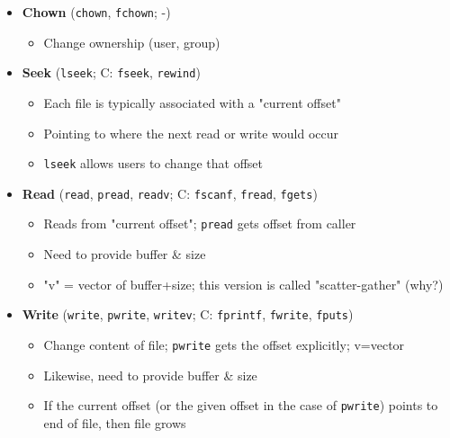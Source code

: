 \documentclass[openany,12pt]{book}
\begin{document}
\begin{itemize}
    \item \textbf{Chown} (\texttt{chown}, \texttt{fchown}; -)
    \begin{itemize}
        \item Change ownership (user, group)
    \end{itemize}

    \item \textbf{Seek} (\texttt{lseek}; C: \texttt{fseek}, \texttt{rewind})
    \begin{itemize}
        \item Each file is typically associated with a "current offset"
        \item Pointing to where the next read or write would occur
        \item \texttt{lseek} allows users to change that offset
    \end{itemize}

    \item \textbf{Read} (\texttt{read}, \texttt{pread}, \texttt{readv}; C: \texttt{fscanf}, \texttt{fread}, \texttt{fgets})
    \begin{itemize}
        \item Reads from "current offset"; \texttt{pread} gets offset from caller
        \item Need to provide buffer \& size
        \item "v" = vector of buffer+size; this version is called "scatter-gather" (why?)
    \end{itemize}

    \item \textbf{Write} (\texttt{write}, \texttt{pwrite}, \texttt{writev}; C: \texttt{fprintf}, \texttt{fwrite}, \texttt{fputs})
    \begin{itemize}
        \item Change content of file; \texttt{pwrite} gets the offset explicitly; v=vector
        \item Likewise, need to provide buffer \& size
        \item If the current offset (or the given offset in the case of \texttt{pwrite}) points to end of file, then file grows
    \end{itemize}


\end{itemize}
\end{document}
